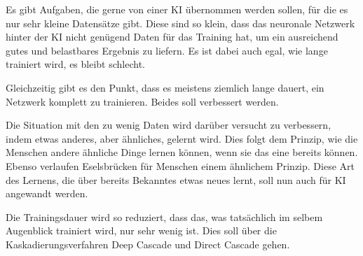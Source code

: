 Es gibt Aufgaben, die gerne von einer KI übernommen werden sollen, für die es nur sehr kleine Datensätze gibt. Diese sind so klein, dass das 
neuronale Netzwerk hinter der KI nicht genügend Daten für das Training hat, um ein ausreichend gutes und belastbares Ergebnis zu liefern. 
Es ist dabei auch egal, wie lange trainiert wird, es bleibt schlecht. 

Gleichzeitig gibt es den Punkt, dass es meistens ziemlich lange dauert, ein Netzwerk komplett zu trainieren. Beides soll verbessert werden. 

Die Situation mit den zu wenig Daten wird darüber versucht zu verbessern, indem etwas anderes, aber ähnliches, gelernt wird. Dies folgt dem 
Prinzip, wie die Menschen andere ähnliche Dinge lernen können, wenn sie das eine bereits können. Ebenso verlaufen Eselsbrücken für Menschen 
einem ähnlichem Prinzip. Diese Art des Lernens, die über bereits Bekanntes etwas neues lernt, soll nun auch für KI angewandt werden. 

Die Trainingsdauer wird so reduziert, dass das, was tatsächlich im selbem Augenblick trainiert wird, nur sehr wenig ist. Dies soll über die 
Kaskadierungsverfahren Deep Cascade und Direct Cascade gehen. 
